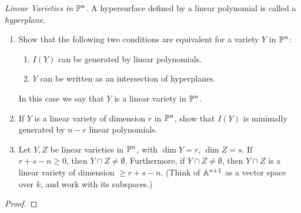 \label{1.2.11}

\textit{Linear Varieties in} $\P^n$. A hypersurface defined by a linear polynomial is called a \textit{hyperplane}.

\begin{enumerate}[label = (\alph*)]
    \item Show that the following two conditions are equivalent for a variety $Y$ in $\P^n$:
    \begin{enumerate}[label = (\roman*)]
        \item $I(Y)$ can be generated by linear polynomials.
        \item $Y$ can be written as an intersection of hyperplanes.
    \end{enumerate}
    In this case we say that $Y$ is a linear variety in $\P^n$.
    
    \item If $Y$ is a linear variety of dimension $r$ in $\P^n$, show that $I(Y)$ is minimally generated by $n - r$ linear polynomials.
    
    \item Let $Y,Z$ be linear varieties in $\P^n$, with $\dim Y = r$, $\dim Z = s$. If $r + s - n \geq 0$, then $Y \cap Z \neq \emptyset$. Furthermore, if $Y \cap Z \neq \emptyset$, then $Y\cap Z$ is a linear variety of dimension $\geq r + s - n$. (Think of $\A^{n + 1}$ as a vector space over $k$, and work with its subspaces.)
\end{enumerate}

\begin{proof}
    
\end{proof}